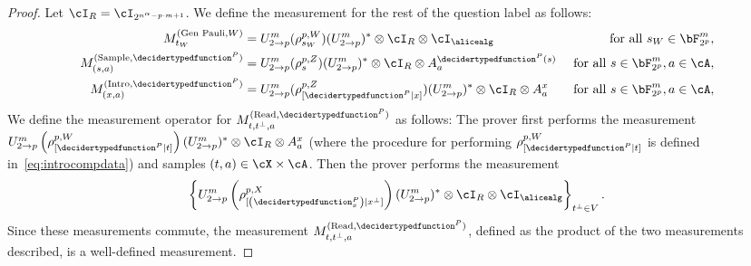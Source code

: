 \begin{proof}
	Let $\cI_R =  \cI_{2^{n^{\alpha} - p \cdot m +1}}$. We define the measurement for the rest of the question label as follows:
	\begin{align*}
			M^{(\text{Gen Pauli}, W)}_{t_W} &= U_{2 \rightarrow p}^m(\rho^{p, W}_{s_W}) (U_{2 \rightarrow p}^m)^* \otimes \cI_{R} \otimes \cI_{\alicealg} &\text{ for all } s_W \in \bF_{2^p}^m, \\
			M^{(\text{Sample}, \decidertypedfunction^{P})}_{(s, a)} &= U_{2 \rightarrow p}^m(\rho^{p, Z}_{s})(U_{2 \rightarrow p}^m)^* \otimes  \cI_{R} \otimes A^{\decidertypedfunction^{P}(s)}_{a } &\text{ for all } s \in \bF_{2^p}^m, a \in \cA, \\
			M^{(\text{Intro}, \decidertypedfunction^{P})}_{(x, a)} &= U_{2 \rightarrow p}^m(\rho^{p, Z}_{[\decidertypedfunction^{P}|x]})(U_{2 \rightarrow p}^m)^* \otimes  \cI_{R} \otimes A^{x}_{a } &\text{ for all } s \in \bF_{2^p}^m, a \in \cA, 
	\end{align*}
	We define the measurement operator for $M^{(\text{Read}, \decidertypedfunction^{P})}_{t, t^{\bot},a}$ as follows: The prover first performs the measurement $U_{2 \rightarrow p}^m \left(\rho^{p, W}_{[\decidertypedfunction^{P}|t]}\right)(U_{2 \rightarrow p}^m)^*\otimes  \cI_{R} \otimes A^{x}_{a}$ (where the procedure for performing $\rho^{p, W}_{[\decidertypedfunction^{P}|t]}$ is defined in~\eqref{eq:introcompdata}) and samples $(t,a) \in \cX \times \cA$. Then the prover performs the measurement 
	\begin{equation*}
		\left\{U_{2 \rightarrow p}^m \left(\rho^{p, X}_{[\left(\decidertypedfunction^{P}_x\right)|x^{\bot}]}\right)(U_{2 \rightarrow p}^m)^* \otimes\cI_{R} \otimes \cI_{\alicealg} \right\}_{t^{\bot} \in V}.
	\end{equation*}
	Since these measurements commute, the measurement $M^{(\text{Read}, \decidertypedfunction^{P})}_{t, t^{\bot},a}$, defined as the product of the two measurements described, is a well-defined measurement. 
	

\end{proof}
